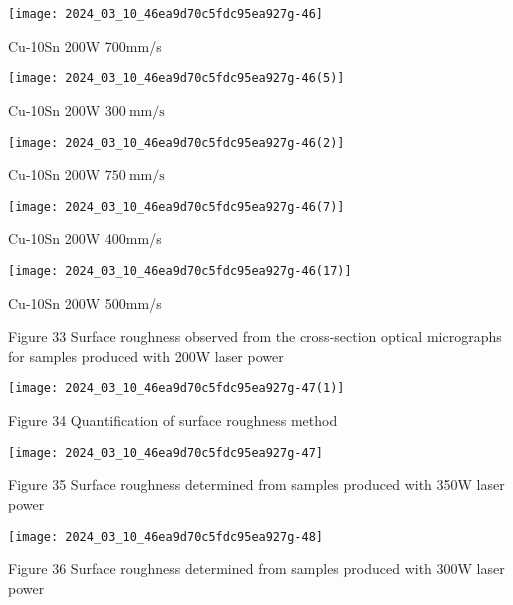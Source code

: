 \documentclass[10pt]{article}
\begin{document}
\begin{center}
\texttt{[image: 2024\_03\_10\_46ea9d70c5fdc95ea927g-46]}
\end{center}

Cu-10Sn 200W 700mm/s

\begin{center}
\texttt{[image: 2024\_03\_10\_46ea9d70c5fdc95ea927g-46(5)]}
\end{center}

Cu-10Sn 200W $300 \mathrm{~mm} / \mathrm{s}$

\begin{center}
\texttt{[image: 2024\_03\_10\_46ea9d70c5fdc95ea927g-46(2)]}
\end{center}

Cu-10Sn 200W $750 \mathrm{~mm} / \mathrm{s}$

\begin{center}
\texttt{[image: 2024\_03\_10\_46ea9d70c5fdc95ea927g-46(7)]}
\end{center}

Cu-10Sn 200W 400mm/s

\begin{center}
\texttt{[image: 2024\_03\_10\_46ea9d70c5fdc95ea927g-46(17)]}
\end{center}

Cu-10Sn 200W 500mm/s

Figure 33 Surface roughness observed from the cross-section optical micrographs for samples produced with 200W laser power

\begin{center}
\texttt{[image: 2024\_03\_10\_46ea9d70c5fdc95ea927g-47(1)]}
\end{center}

Figure 34 Quantification of surface roughness method

\begin{center}
\texttt{[image: 2024\_03\_10\_46ea9d70c5fdc95ea927g-47]}
\end{center}

Figure 35 Surface roughness determined from samples produced with 350W laser power

\begin{center}
\texttt{[image: 2024\_03\_10\_46ea9d70c5fdc95ea927g-48]}
\end{center}

Figure 36 Surface roughness determined from samples produced with 300W laser power
\end{document}
